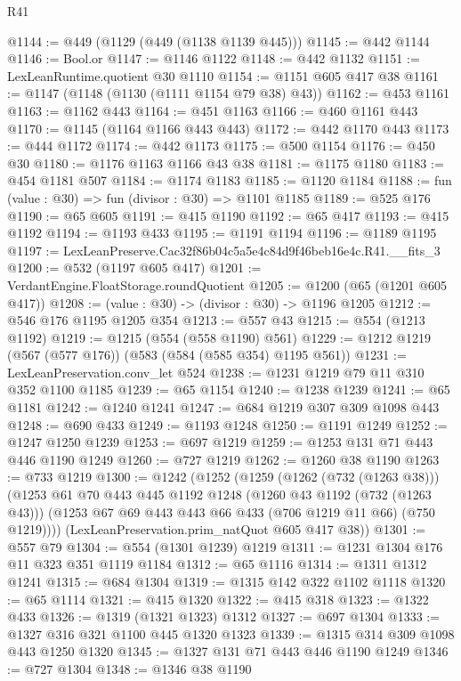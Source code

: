 \begin{lexlean}{R41}
\begin{coremodule}
@1144 := @449 (@1129 (@449 (@1138 @1139 @445)))
@1145 := @442 @1144
@1146 := Bool.or
@1147 := @1146 @1122
@1148 := @442 @1132
@1151 := LexLeanRuntime.quotient @30 @1110
@1154 := @1151 @605 @417 @38
@1161 := @1147 (@1148 (@1130 (@1111 @1154 @79 @38) @43))
@1162 := @453 @1161
@1163 := @1162 @443
@1164 := @451 @1163
@1166 := @460 @1161 @443
@1170 := @1145 (@1164 @1166 @443 @443)
@1172 := @442 @1170 @443
@1173 := @444 @1172
@1174 := @442 @1173
@1175 := @500 @1154
@1176 := @450 @30
@1180 := @1176 @1163 @1166 @43 @38
@1181 := @1175 @1180
@1183 := @454 @1181 @507
@1184 := @1174 @1183
@1185 := @1120 @1184
@1188 := fun (value : @30) => fun (divisor : @30) => @1101 @1185
@1189 := @525 @176
@1190 := @65 @605
@1191 := @415 @1190
@1192 := @65 @417
@1193 := @415 @1192
@1194 := @1193 @433
@1195 := @1191 @1194
@1196 := @1189 @1195
@1197 := LexLeanPreserve.Cac32f86b04c5a5e4c84d9f46beb16e4c.R41.__fits_3
@1200 := @532 (@1197 @605 @417)
@1201 := VerdantEngine.FloatStorage.roundQuotient
@1205 := @1200 (@65 (@1201 @605 @417))
@1208 := (value : @30) -> (divisor : @30) -> @1196 @1205
@1212 := @546 @176 @1195 @1205 @354
@1213 := @557 @43
@1215 := @554 (@1213 @1192)
@1219 := @1215 (@554 (@558 @1190) @561)
@1229 := @1212 @1219 (@567 (@577 @176)) (@583 (@584 (@585 @354) @1195 @561))
@1231 := LexLeanPreservation.conv_let @524
@1238 := @1231 @1219 @79 @11 @310 @352 @1100 @1185
@1239 := @65 @1154
@1240 := @1238 @1239
@1241 := @65 @1181
@1242 := @1240 @1241
@1247 := @684 @1219 @307 @309 @1098 @443
@1248 := @690 @433
@1249 := @1193 @1248
@1250 := @1191 @1249
@1252 := @1247 @1250 @1239
@1253 := @697 @1219
@1259 := @1253 @131 @71 @443 @446 @1190 @1249
@1260 := @727 @1219
@1262 := @1260 @38 @1190
@1263 := @733 @1219
@1300 := @1242
    (@1252
      (@1259
        (@1262 (@732 (@1263 @38)))
        (@1253
          @61
          @70
          @443
          @445
          @1192
          @1248
          (@1260 @43 @1192 (@732 (@1263 @43)))
          (@1253 @67 @69 @443 @443 @66 @433 (@706 @1219 @11 @66) (@750 @1219))))
      (LexLeanPreservation.prim_natQuot @605 @417 @38))
@1301 := @557 @79
@1304 := @554 (@1301 @1239) @1219
@1311 := @1231 @1304 @176 @11 @323 @351 @1119 @1184
@1312 := @65 @1116
@1314 := @1311 @1312 @1241
@1315 := @684 @1304
@1319 := @1315 @142 @322 @1102 @1118
@1320 := @65 @1114
@1321 := @415 @1320
@1322 := @415 @318
@1323 := @1322 @433
@1326 := @1319 (@1321 @1323) @1312
@1327 := @697 @1304
@1333 := @1327 @316 @321 @1100 @445 @1320 @1323
@1339 := @1315 @314 @309 @1098 @443 @1250 @1320
@1345 := @1327 @131 @71 @443 @446 @1190 @1249
@1346 := @727 @1304
@1348 := @1346 @38 @1190

\end{coremodule}
\end{lexlean}
